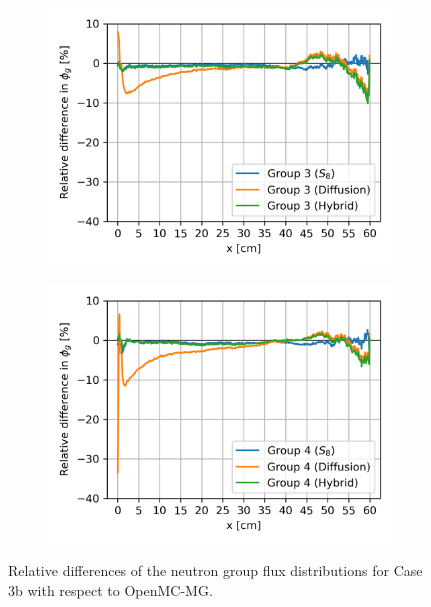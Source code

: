 \begin{frame}
\begin{figure}
\begin{subfigure}[t]{.34\textwidth}
      \centering
      \includegraphics[width=\textwidth]{../images/case-3b-group-3-flux-error}
      \label{fig:c3bg3e}
    \end{subfigure}
    \begin{subfigure}[t]{.34\textwidth}
      \centering
      \includegraphics[width=\textwidth]{../images/case-3b-group-4-flux-error}
      \label{fig:c3bg4e}
    \end{subfigure}
    \caption{Relative differences of the neutron group flux distributions for Case 3b with respect
    to OpenMC-MG.}
    \label{fig:c3bfluxe}
  \end{figure}
\end{frame}

